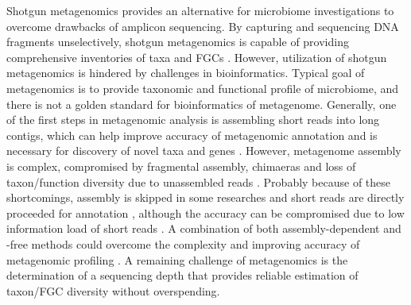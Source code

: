 \documentclass[11pt]{article}
\begin{document}
  \newline
  Shotgun metagenomics provides an alternative for microbiome investigations to overcome drawbacks of amplicon sequencing. 
  By capturing and sequencing DNA fragments unselectively, shotgun metagenomics is capable of providing comprehensive inventories of taxa and FGCs \citep{quince2017shotgun,new2020metagenomics,galloway2020tools}. 
  However, utilization of shotgun metagenomics is hindered by challenges in bioinformatics. 
  Typical goal of metagenomics is to provide taxonomic and functional profile of microbiome, and there is not a golden standard for bioinformatics of metagenome. 
  Generally, one of the first steps in metagenomic analysis is assembling short reads into long contigs, which can help improve accuracy of metagenomic annotation \citep{wommack2008metagenomics,carr2014comparative,tran2020assembling} and is necessary for 
  discovery of novel taxa and genes \citep{culligan2014metagenomics,youngblut2020large}. 
  However, metagenome assembly is complex, compromised by fragmental assembly, chimaeras \citep{mikheenko2016metaquast} and loss of taxon/function diversity due to unassembled reads \citep{vollmers2017comparing,ayling2020new}. 
  Probably because of these shortcomings, assembly is skipped in some researches and short reads are directly proceeded for annotation \citep{tringe2005comparative,abubucker2012metabolic,vermote2018amplicon,bovo2018shotgun}, although the accuracy can be compromised due to low information load of short reads \citep{wommack2008metagenomics,carr2014comparative,tran2020assembling}. 
  A combination of both assembly-dependent and -free methods could overcome the complexity and improving accuracy of metagenomic profiling \citep{becker2020modular}.
  \newline
  A remaining challenge of metagenomics is the determination of a sequencing depth that provides reliable estimation of taxon/FGC diversity without overspending. 
\end{document}
